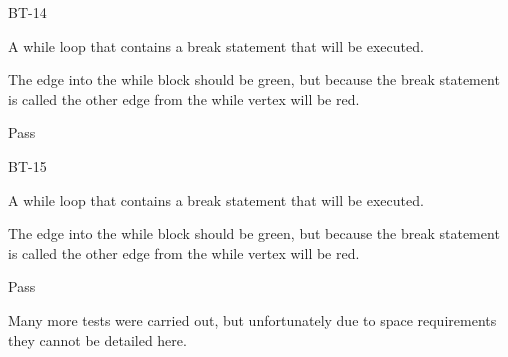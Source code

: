 \begin{description}[style=sameline,leftmargin=3.5cm,nolistsep]
\item[\hspace*{0.3cm}Label] BT-14
\item[\hspace*{0.3cm}Description] A while loop that contains a break statement that will be executed.
\item[\hspace*{0.3cm}Expected Output] The edge into the while block should be green, but because the break statement is called the other edge from the while vertex will be red.
\item[\hspace*{0.3cm}Result] Pass
\end{description}

\begin{samepage}
\begin{description}[style=sameline,leftmargin=3.5cm,nolistsep]
\item[\hspace*{0.3cm}Label] BT-15
\item[\hspace*{0.3cm}Description] A while loop that contains a break statement that will be executed.
\item[\hspace*{0.3cm}Expected Output] The edge into the while block should be green, but because the break statement is called the other edge from the while vertex will be red.
\item[\hspace*{0.3cm}Result] Pass
\end{description}
\end{samepage}

Many more tests were carried out, but unfortunately due to space requirements they cannot be detailed here.